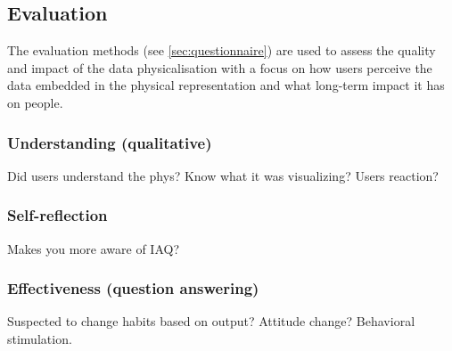 \subsection{Evaluation}

The evaluation methods (see \ref{sec:questionnaire}) are used to assess the quality and impact of the data physicalisation with a focus on how users perceive the data embedded in the physical representation and what long-term impact it has on people.


\subsubsection{Understanding (qualitative)}

Did users understand the phys? Know what it was visualizing? Users reaction?

\subsubsection{Self-reflection}

Makes you more aware of IAQ?

\subsubsection{Effectiveness (question answering)}

Suspected to change habits based on output? Attitude change? Behavioral stimulation.



